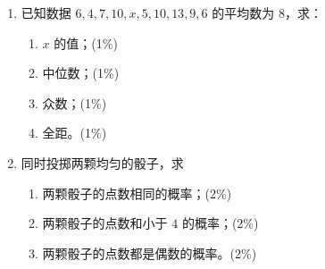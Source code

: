 \documentclass[12pt,a4paper]{exam-zh}
\begin{document}
\begin{question}
    \begin{enumerate}[label=(\alph*)]
        \item 已知数据 $6,4,7,10,x,5,10,13,9,6$ 的平均数为 $8$，求：
        \begin{enumerate}[label=(\roman*)]
                \item $x$ 的值；\hfill(1\%)
                \item 中位数；\hfill(1\%)
                \item 众数；\hfill(1\%)
                \item 全距。\hfill(1\%)
        \end{enumerate}
        \item 同时投掷两颗均匀的骰子，求
        \begin{enumerate}[label=(\roman*)]
                \item 两颗骰子的点数相同的概率；\hfill(2\%)
                \item 两颗骰子的点数和小于 $4$ 的概率；\hfill(2\%)
                \item 两颗骰子的点数都是偶数的概率。\hfill(2\%)
        \end{enumerate}
    \end{enumerate}
\end{question}
 
\end{document}
